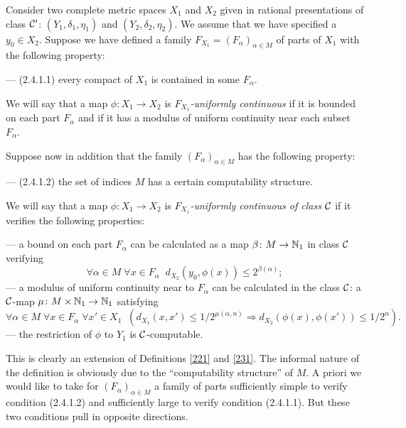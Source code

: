 \begin{definition}\label{241}

Consider two complete metric spaces $X_1$ and $X_2$ given in rational presentations of class ${{\cal C}}'$: $(Y_1,\delta_1,\eta_1)$ and $(Y_2,\delta_2,\eta_2)$. We assume that we have specified a $y_0\in X_2$.
Suppose we have defined a family $F_{X_1} = (F_{\alpha})_{\alpha \in M}$ of parts of $X_1$ with the following property:

\noindent 
--- (2.4.1.1) every compact of $X_1$ is contained in some $F_{\alpha}$. 


\noindent 
We will say that a map $\phi: X_1 \to X_2$ is {\em $F_{X_1}$-uniformly continuous} if it is bounded on each part $F_{\alpha}$ and if it has a modulus of uniform continuity near each subset $F_{\alpha}$.

\noindent 
Suppose now in addition that the family $(F_{\alpha})_{\alpha \in M}$ has the following property:

\noindent 
--- (2.4.1.2) the set of indices $M$ has a certain computability structure.

\noindent 
We will say that a map $\phi: X_1 \to X_2$ is \emph{$F_{X_1}$-uniformly continuous of class ${{\cal C}}$} if it verifies the following properties:

\noindent 
--- a bound on each part $F_{\alpha}$ can be calculated as a map $ \beta\colon M \to \mathbb {N}_1$ in class ${{\cal C}}$ verifying  
\[
\forall \alpha \in M \; \forall x \in F_{\alpha} \; \;
 d_{X_2}(y_0, \phi (x)) \leq 2^{\beta(\alpha)};
\] 
--- a modulus of uniform continuity near to $F_{\alpha}$ can be calculated in the class ${{\cal C}}$: a ${{\cal C}}$-map $\mu\colon M \times \mathbb {N}_1 \to \mathbb {N}_1$  satisfying
\[
\forall \alpha \in M \; \forall x \in F_\alpha\; \forall x' \in X_1\;\;  \left(d_{X_1}(x,x') \leq 1/2^{\mu(\alpha,n)} \Rightarrow d_{X_2}(\phi(x),\phi(x')) \leq 1/2^n \right).
\]
--- the restriction of $\phi$ to $Y_1$ is ${{\cal C}}$-computable.
\end{definition}

This is clearly an extension of Definitions \ref{221} and \ref{231}.
The informal nature of the definition is obviously due to the ``computability structure'' of $M$.
A priori we would like to take for $(F_{\alpha})_{\alpha \in M}$ a family of parts sufficiently simple to verify condition (2.4.1.2) and sufficiently large to verify condition (2.4.1.1).
But these two conditions pull in opposite directions.

